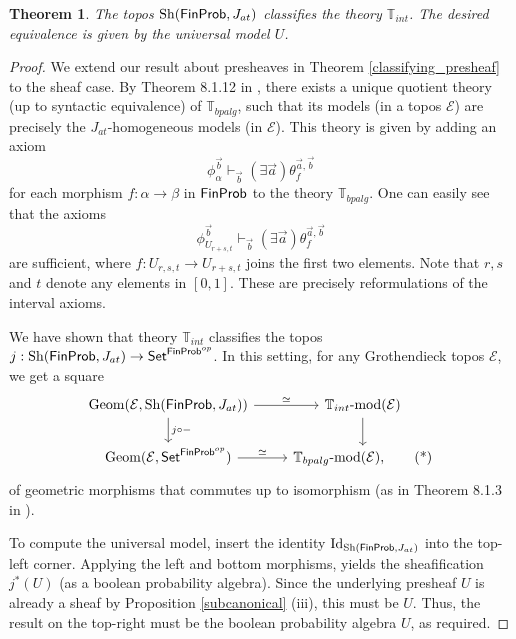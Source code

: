 \documentclass[a4paper]{amsproc}
\theoremstyle{plain}
\newtheorem{theorem}{Theorem}[section]
\theoremstyle{definition}
\theoremstyle{remark}
\numberwithin{equation}{section}
\DeclareMathOperator{\Sh}{Sh}
\DeclareMathOperator{\Geom}{Geom}
\newcommand{\Set}{\textup{\textsf{Set}}}
\newcommand{\FinProb}{\textup{\textsf{FinProb}}}
\begin{document}
\begin{theorem} \label{classifying}
    The topos $\Sh(\FinProb,J_{at})$ classifies the theory $\mathbb{T}_{int}$. The desired equivalence is given by the universal model $U$.
\end{theorem}

\begin{proof}
    We extend our result about presheaves in Theorem \ref{classifying_presheaf} to the sheaf case. By Theorem 8.1.12 in \cite{caramello2018theories}, there exists a unique quotient theory (up to syntactic equivalence) of $\mathbb{T}_{bpalg}$, such that its models (in a topos $\mathcal{E}$) are precisely the $J_{at}$-homogeneous models (in $\mathcal{E}$).
    This theory is given by adding an axiom
    \[
    \phi_{\alpha}^{\vec{b}} \vdash_{\vec{b}} (\exists \vec{a}) \theta_f^{\vec{a},\vec{b}}
    \]
    for each morphism $f: \alpha \to \beta$ in $\FinProb$ to the theory $\mathbb{T}_{bpalg}$. One can easily see that the axioms
    \[
    \phi_{U_{r+s,t}}^{\vec{b}} \vdash_{\vec{b}} (\exists \vec{a}) \theta_f^{\vec{a},\vec{b}}
    \]
    are sufficient, where $f: U_{r,s,t} \to U_{r+s,t}$ joins the first two elements. Note that $r,s$ and $t$ denote any elements in $[0,1]$. These are precisely reformulations of the interval axioms.

    We have shown that theory $\mathbb{T}_{int}$ classifies the topos $j: \Sh(\FinProb, J_{at}) \to \Set^{\FinProb^{op}}$. In this setting, for any Grothendieck topos $\mathcal{E}$, we get a square
    \begin{equation}\label{geometric_com}
        \begin{tikzcd}
            \Geom(\mathcal{E},\Sh(\FinProb,J_{at})) \arrow[d, "j \circ -"] \arrow[r, "\simeq"] & {\mathbb{T}_{int}\textup{-mod}(\mathcal{E})} \arrow[d] \\
            \Geom(\mathcal{E},\Set^{\FinProb^{op}}) \arrow[r, "\simeq"]         & {\mathbb{T}_{bpalg}\textup{-mod}(\mathcal{E})}, \tag{*}
        \end{tikzcd}
    \end{equation}
    of geometric morphisms that commutes up to isomorphism (as in Theorem 8.1.3 in \cite{caramello2018theories}). 
    
    To compute the universal model, insert the identity $\textup{Id}_{\Sh(\FinProb,J_{at})}$ into the top-left corner. Applying the left and bottom morphisms, yields the sheafification $j^*(U)$ (as a boolean probability algebra). Since the underlying presheaf $U$ is already a sheaf by Proposition \ref{subcanonical} (iii), this must be $U$. Thus, the result on the top-right must be the boolean probability algebra $U$, as required.
\end{proof}
\end{document}
